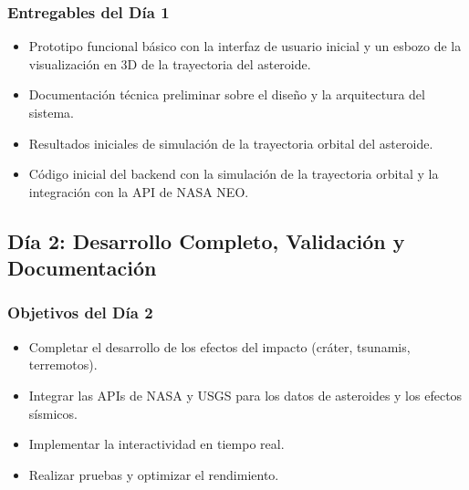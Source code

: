 \documentclass[conference]{IEEEtran}
\begin{document}
\subsubsection*{Entregables del Día 1}
\begin{itemize}
	\item Prototipo funcional básico con la interfaz de usuario inicial y un
	      esbozo de la visualización en 3D de la trayectoria del asteroide.
	\item Documentación técnica preliminar sobre el diseño y la arquitectura del sistema.
	\item Resultados iniciales de simulación de la trayectoria orbital del asteroide.
	\item Código inicial del backend con la simulación de la trayectoria
	      orbital y la integración con la API de NASA NEO.
\end{itemize}


\subsection{Día 2: Desarrollo Completo, Validación y Documentación}
\subsubsection*{Objetivos del Día 2}
\begin{itemize}
	\item Completar el desarrollo de los efectos del impacto (cráter, tsunamis, terremotos).
	\item Integrar las APIs de NASA y USGS para los datos de asteroides y los efectos sísmicos.
	\item Implementar la interactividad en tiempo real.
	\item Realizar pruebas y optimizar el rendimiento.
\end{itemize}
\end{document}
